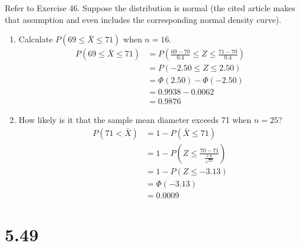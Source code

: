 \documentclass[letterpaper,12pt,fleqn]{article}
\newcommand{\xb}{\bar{X}}
\renewcommand{\P}{\Phi}
\begin{document}
Refer to Exercise 46.  Suppose the distribution is normal (the cited article makes that assumption and even includes the
corresponding normal density curve).
\begin{enumerate}[label={\alph*)}]
\item Calculate \(P(69\le\xb\le71)\) when \(n=16\).
  \begin{align*}
    P(69\le\xb\le71) &= P\left(\frac{69-70}{0.4}\le Z\le\frac{71-70}{0.4}\right) \\
    &= P(-2.50\le Z\le 2.50) \\
    &= \P(2.50)-\P(-2.50) \\
    &= 0.9938-0.0062 \\
    &= 0.9876
  \end{align*}
\item How likely is it that the sample mean diameter exceeds 71 when \(n=25\)?
  \begin{align*}
    P(71<\xb) &= 1-P(\xb\le71) \\
    &= 1-P\left(Z\le\frac{70-71}{\frac{1.6}{\sqrt{25}}}\right) \\
    &= 1-P(Z\le-3.13) \\
    &= \P(-3.13) \\
    &= 0.0009
  \end{align*}
\end{enumerate}

\section*{5.49}
\end{document}
